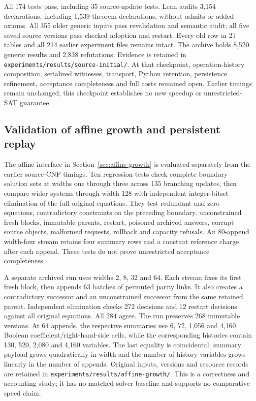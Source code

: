 \documentclass[11pt,a4paper]{article}
\numberwithin{equation}{section}
\theoremstyle{plain}
\theoremstyle{definition}
\theoremstyle{remark}
\begin{document}
All 174 tests pass, including 35 source-update tests. Lean audits 3,154 declarations, including 1,539 theorem declarations, without admits or added axioms. All 355 older generic inputs pass revalidation and semantic audit; all five saved source versions pass checked adoption and restart. Every old row in 21 tables and all 214 earlier experiment files remains intact. The archive holds 8,520 generic results and 2,838 refutations. Evidence is retained in \texttt{experiments/results/source-initial/}. At that checkpoint, operation-history composition, serialized witnesses, transport, Python retention, persistence refinement, acceptance completeness and full costs remained open. Earlier timings remain unchanged; this checkpoint establishes no new speedup or unrestricted-SAT guarantee.

\subsection{Validation of affine growth and persistent replay}

The affine interface in Section~\ref{sec:affine-growth} is evaluated separately from the earlier source-CNF timings. Ten regression tests check complete boundary solution sets at widths one through three across 135 branching updates, then compare wider systems through width 128 with independent integer-bitset elimination of the full original equations. They test redundant and zero equations, contradictory constraints on the preceding boundary, unconstrained fresh blocks, immutable parents, restart, poisoned archived answers, corrupt source objects, malformed requests, rollback and capacity refusals. An 80-append width-four stream retains four summary rows and a constant reference charge after each append. These tests do not prove unrestricted acceptance completeness.

A separate archived run uses widths 2, 8, 32 and 64. Each stream fixes its first fresh block, then appends 63 batches of permuted parity links. It also creates a contradictory successor and an unconstrained successor from the same retained parent. Independent elimination checks 272 decisions and 12 restart decisions against all original equations. All 284 agree. The run preserves 268 immutable versions. At 64 appends, the respective summaries use 6, 72, 1,056 and 4,160 Boolean coefficient/right-hand-side cells, while the corresponding histories contain 130, 520, 2,080 and 4,160 variables. The last equality is coincidental: summary payload grows quadratically in width and the number of history variables grows linearly in the number of appends. Original inputs, versions and resource records are retained in \texttt{experiments/results/affine-growth/}. This is a correctness and accounting study; it has no matched solver baseline and supports no comparative speed claim.
\end{document}
